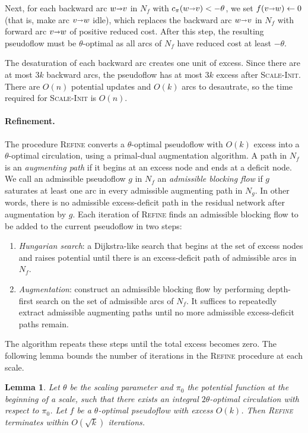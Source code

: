 \documentclass[11pt]{article}
\def\arcto{\mathord\shortrightarrow}
\def\arc#1#2{#1\arcto#2}
\newtheorem{lemma}{Lemma}[section]
\numberwithin{figure}{section}
\def\EMPH#1{\textcolor{BrickRed}{{\emph{#1}}}}
\begin{document}
Next, for each backward arc $\arc wv$ in $N_f$ with $c_\pi(\arc wv) < -\theta$,
we set $f(\arc vw) \gets 0$ (that is, make arc $\arc vw$ idle), which replaces the
backward arc $\arc wv$ in $N_f$ with forward arc $\arc vw$ of positive reduced cost.
After this step, the resulting pseudoflow must be $\theta$-optimal as all arcs
of $N_f$ have reduced cost at least $-\theta$.

The desaturation of each backward arc creates one unit of excess.
Since there are at most $3k$ backward arcs, the pseudoflow has at most $3k$ excess after
\textsc{Scale-Init}.
There are $O(n)$ potential updates and $O(k)$ arcs to desautrate,
so the time required for \textsc{Scale-Init} is $O(n)$.

\paragraph*{Refinement.}
The procedure \textsc{Refine} converts a $\theta$-optimal pseudoflow with
$O(k)$ excess into a $\theta$-optimal circulation, using a primal-dual
augmentation algorithm.
A path in $N_f$ is an \EMPH{augmenting path} if it begins at an excess node
and ends at a deficit node.
We call an admissible pseudoflow $g$ in $N_f$ an
\EMPH{admissible blocking flow} if $g$ saturates at least one arc in every
admissible augmenting path in $N_g$.
In other words, there is no admissible excess-deficit path in the residual
network after augmentation by $g$.
Each iteration of \textsc{Refine} finds an admissible blocking flow to be added
to the current pseudoflow in two steps:
\begin{enumerate}
\item
\EMPH{Hungarian search}: a Dijkstra-like search that begins at the set of
excess nodes and raises potential until there is an excess-deficit path
of admissible arcs in $N_f$.
\item
\EMPH{Augmentation}: construct an admissible blocking flow by performing
depth-first search on the set of admissible arcs of $N_f$.
It suffices to repeatedly extract admissible augmenting paths until no more
admissible excess-deficit paths remain.
\end{enumerate}
The algorithm repeats these steps until the total excess becomes zero.
The following lemma bounds the number of iterations in the \textsc{Refine}
procedure at each scale.

\begin{lemma}
\label{lemma:refine_iters}
Let $\theta$ be the scaling parameter and $\pi_0$ the potential function at the
beginning of a scale, such that there exists an integral $2\theta$-optimal
circulation with respect to $\pi_0$.
Let $f$ be a $\theta$-optimal pseudoflow with excess $O(k)$.
Then \textsc{Refine} terminates within $O(\sqrt{k})$ iterations.
\end{lemma}
\end{document}
